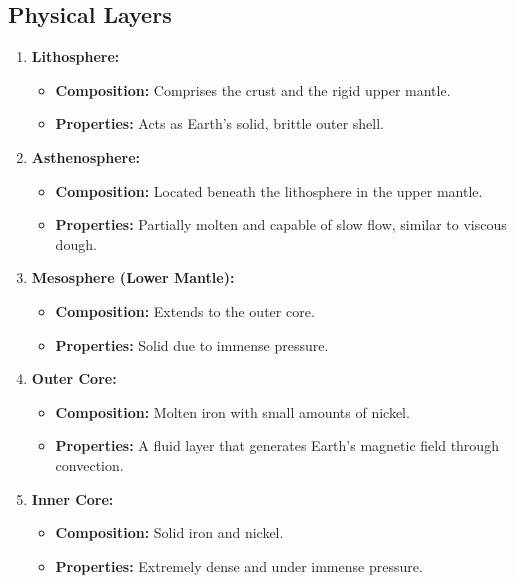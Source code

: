 \documentclass{article}
\begin{document}
\subsection*{Physical Layers}
\begin{enumerate}
    \item \textbf{Lithosphere:} 
        \begin{itemize}
            \item \textbf{Composition:} Comprises the crust and the rigid upper mantle.
            \item \textbf{Properties:} Acts as Earth's solid, brittle outer shell.
        \end{itemize}
    \item \textbf{Asthenosphere:} 
        \begin{itemize}
            \item \textbf{Composition:} Located beneath the lithosphere in the upper mantle.
            \item \textbf{Properties:} Partially molten and capable of slow flow, similar to viscous dough.
        \end{itemize}
    \item \textbf{Mesosphere (Lower Mantle):} 
        \begin{itemize}
            \item \textbf{Composition:} Extends to the outer core.
            \item \textbf{Properties:} Solid due to immense pressure.
        \end{itemize}
    \item \textbf{Outer Core:}
        \begin{itemize}
            \item \textbf{Composition:} Molten iron with small amounts of nickel.
            \item \textbf{Properties:} A fluid layer that generates Earth's magnetic field through convection.
        \end{itemize}
    \item \textbf{Inner Core:}
        \begin{itemize}
            \item \textbf{Composition:} Solid iron and nickel.
            \item \textbf{Properties:} Extremely dense and under immense pressure.
        \end{itemize}
\end{enumerate}
\end{document}

